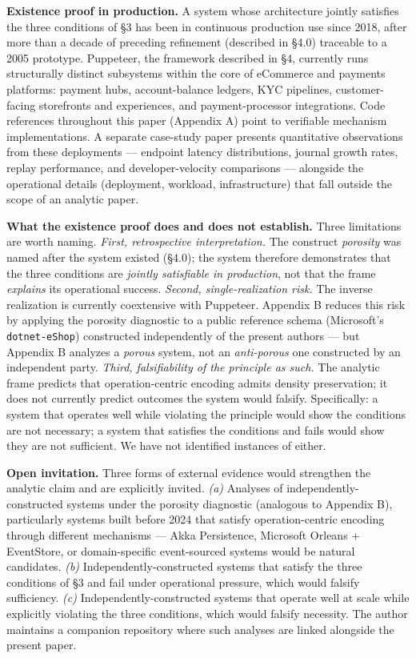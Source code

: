 \documentclass[
]{article}
\let\origtexttt\texttt%
\renewcommand{\texttt}[1]{\origtexttt{\seqsplit{#1}}}%
\let\texttt\origtexttt%
\begin{document}
\textbf{Existence proof in production.} A system whose architecture
jointly satisfies the three conditions of §3 has been in continuous
production use since 2018, after more than a decade of preceding
refinement (described in §4.0) traceable to a 2005 prototype. Puppeteer,
the framework described in §4, currently runs structurally distinct
subsystems within the core of eCommerce and payments platforms: payment
hubs, account-balance ledgers, KYC pipelines, customer-facing
storefronts and experiences, and payment-processor integrations. Code
references throughout this paper (Appendix A) point to verifiable
mechanism implementations. A separate case-study paper presents
quantitative observations from these deployments --- endpoint latency
distributions, journal growth rates, replay performance, and
developer-velocity comparisons --- alongside the operational details
(deployment, workload, infrastructure) that fall outside the scope of an
analytic paper.

\textbf{What the existence proof does and does not establish.} Three
limitations are worth naming. \emph{First, retrospective
interpretation.} The construct \emph{porosity} was named after the
system existed (§4.0); the system therefore demonstrates that the three
conditions are \emph{jointly satisfiable in production}, not that the
frame \emph{explains} its operational success. \emph{Second,
single-realization risk.} The inverse realization is currently
coextensive with Puppeteer. Appendix B reduces this risk by applying the
porosity diagnostic to a public reference schema (Microsoft's
\texttt{dotnet-eShop}) constructed independently of the present authors
--- but Appendix B analyzes a \emph{porous} system, not an
\emph{anti-porous} one constructed by an independent party. \emph{Third,
falsifiability of the principle as such.} The analytic frame predicts
that operation-centric encoding admits density preservation; it does not
currently predict outcomes the system would falsify. Specifically: a
system that operates well while violating the principle would show the
conditions are not necessary; a system that satisfies the conditions and
fails would show they are not sufficient. We have not identified
instances of either.

\textbf{Open invitation.} Three forms of external evidence would
strengthen the analytic claim and are explicitly invited. \emph{(a)}
Analyses of independently-constructed systems under the porosity
diagnostic (analogous to Appendix B), particularly systems built before
2024 that satisfy operation-centric encoding through different
mechanisms --- Akka Persistence, Microsoft Orleans + EventStore, or
domain-specific event-sourced systems would be natural candidates.
\emph{(b)} Independently-constructed systems that satisfy the three
conditions of §3 and fail under operational pressure, which would
falsify sufficiency. \emph{(c)} Independently-constructed systems that
operate well at scale while explicitly violating the three conditions,
which would falsify necessity. The author maintains a companion
repository where such analyses are linked alongside the present paper.
\end{document}
